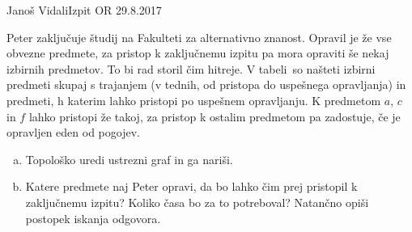 \begin{naloga}{Janoš Vidali}{Izpit OR 29.8.2017}
\begin{vprasanje}
Peter zaključuje študij na Fakulteti za alternativno znanost.
Opravil je že vse obvezne predmete,
za pristop k zaključnemu izpitu pa mora opraviti še nekaj izbirnih predmetov.
To bi rad storil čim hitreje.
V tabeli~\tab so našteti izbirni predmeti
skupaj s trajanjem (v tednih, od pristopa do uspešnega opravljanja)
in predmeti, h katerim lahko pristopi po uspešnem opravljanju.
K predmetom $a$, $c$ in $f$ lahko pristopi že takoj,
za pristop k ostalim predmetom pa zadostuje, če je opravljen eden od pogojev.

\begin{enumerate}[(a)]
\item Topološko uredi ustrezni graf in ga nariši.
\item Katere predmete naj Peter opravi,
da bo lahko čim prej pristopil k zaključnemu izpitu?
Koliko časa bo za to potreboval?
Natančno opiši postopek iskanja odgovora.
\end{enumerate}

\begin{tabela}
\end{tabela}
\end{vprasanje}


\end{naloga}
